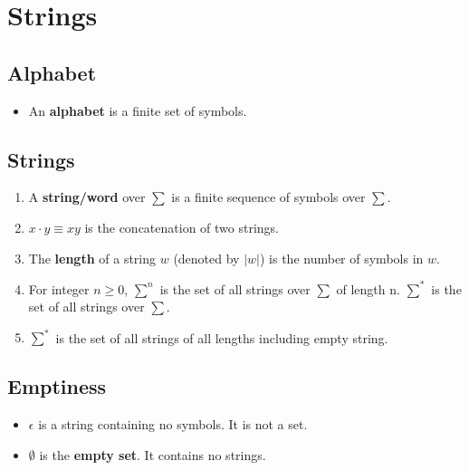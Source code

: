 
\section{Strings}

\subsection{Alphabet}
\begin{itemize}
    \item An \textbf{alphabet} is a finite set of symbols.
\end{itemize}

\subsection{Strings}
\begin{enumerate}
    \item A \textbf{string/word} over $\sum$ is a finite sequence of symbols over $\sum$.
    \item $x \cdot y \equiv xy$ is the concatenation of two strings.
    \item The \textbf{length} of a string $w$ (denoted by $\left| w \right|$) is the number of symbols in $w$.
    \item For integer $n \geq 0$, $\sum^{n}$ is the set of all strings over $\sum$ of length n. $\sum^{\ast}$ is the set of all strings over $\sum$.
    \item $\sum^{\ast}$ is the set of all strings of all lengths including empty string.
\end{enumerate}

\subsection{Emptiness}
\begin{itemize}
    \item $\epsilon$ is a string containing no symbols. It is not a set.
    \item $\emptyset$ is the \textbf{empty set}. It contains no strings.
\end{itemize}

